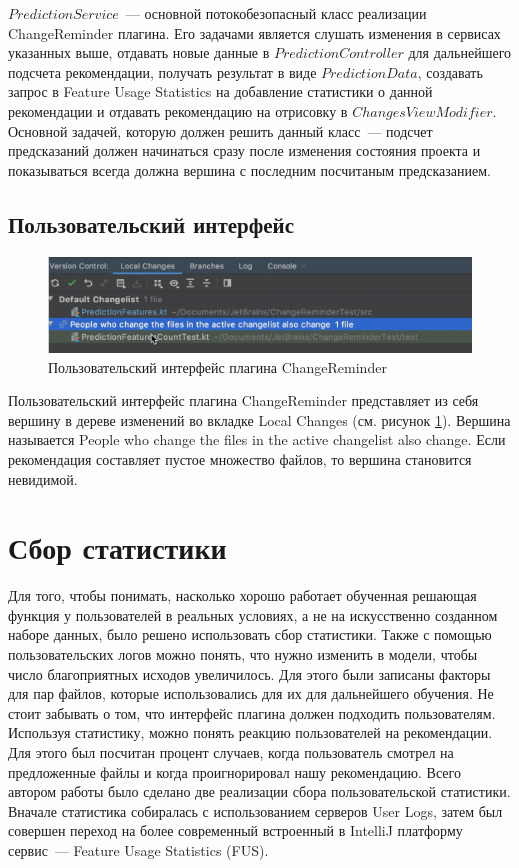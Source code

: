 $PredictionService$~--- основной потокобезопасный класс реализации ChangeReminder плагина. Его задачами является слушать изменения в сервисах указанных выше, отдавать новые данные в $PredictionController$ для дальнейшего подсчета рекомендации, получать результат в виде $PredictionData$, создавать запрос в Feature Usage Statistics на добавление статистики о данной рекомендации и отдавать рекомендацию на отрисовку в $ChangesViewModifier$. Основной задачей, которую должен решить данный класс~--- подсчет предсказаний должен начинаться сразу после изменения состояния проекта и показываться всегда должна вершина с последним посчитаным предсказанием.

\subsection{Пользовательский интерфейс}
\begin{figure}[!h]
\caption{Пользовательский интерфейс плагина ChangeReminder}\label{ChangeReminder-ui}
\centering
\includegraphics[scale=0.4]{images/ChangeReminderUI.png}
\end{figure}
Пользовательский интерфейс плагина ChangeReminder представляет из себя вершину в дереве изменений во вкладке Local Changes (см. рисунок \ref{ChangeReminder-ui}). Вершина называется People who change the files in the active changelist also change. Если рекомендация составляет пустое множество файлов, то вершина становится невидимой.


\section{Сбор статистики}\label{stats-main}
Для того, чтобы понимать, насколько хорошо работает обученная решающая функция у пользователей в реальных условиях, а не на искусственно созданном наборе данных, было решено использовать сбор статистики. Также с помощью пользовательских логов можно понять, что нужно изменить в модели, чтобы число благоприятных исходов увеличилось. Для этого были записаны факторы для пар файлов, которые использовались для их для дальнейшего обучения. Не стоит забывать о том, что интерфейс плагина должен подходить пользователям. Используя статистику, можно понять реакцию пользователей на рекомендации. Для этого был посчитан процент случаев, когда пользователь смотрел на предложенные файлы и когда проигнорировал нашу рекомендацию. Всего автором работы было сделано две реализации сбора пользовательской статистики. Вначале статистика собиралась с использованием серверов User Logs, затем был совершен переход на более современный встроенный в IntelliJ платформу сервис~--- Feature Usage Statistics (FUS).
